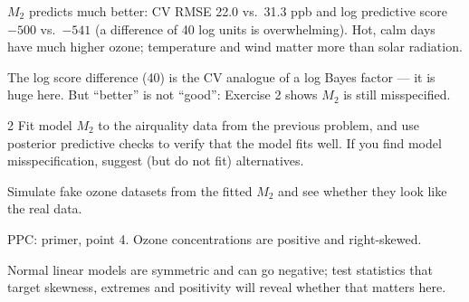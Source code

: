 \documentclass[11pt]{article}
\begin{document}
\begin{answer}
$M_2$ predicts much better: CV RMSE 22.0 vs.\ 31.3 ppb and log predictive score $-500$ vs.\ $-541$ (a difference of 40 log units is overwhelming). Hot, calm days have much higher ozone; temperature and wind matter more than solar radiation.
\end{answer}

\begin{takeaway}
The log score difference (40) is the CV analogue of a log Bayes factor --- it is huge here. But ``better'' is not ``good'': Exercise 2 shows $M_2$ is still misspecified.
\end{takeaway}


\begin{problem}{2}
Fit model $M_2$ to the airquality data from the previous problem, and use posterior predictive checks to verify that the model fits well. If you find model misspecification, suggest (but do not fit) alternatives.
\end{problem}

\begin{restate}
Simulate fake ozone datasets from the fitted $M_2$ and see whether they look like the real data.
\end{restate}

\begin{recall}
PPC: primer, point 4. Ozone concentrations are positive and right-skewed.
\end{recall}

\begin{keyidea}
Normal linear models are symmetric and can go negative; test statistics that target skewness, extremes and positivity will reveal whether that matters here.
\end{keyidea}
\end{document}
